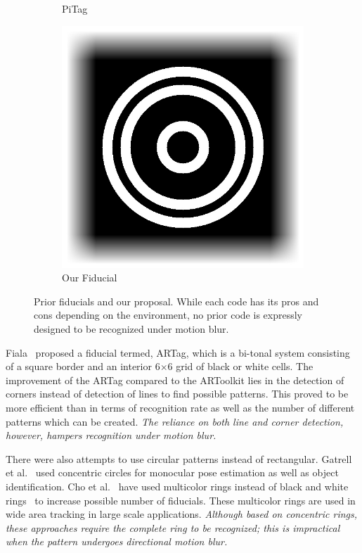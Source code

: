 \begin{figure}[b!]
\begin{subfigure}[b]{0.12\linewidth}
  PiTag\quad~\cite{Pitag13}
 \end{subfigure}\quad
 \begin{subfigure}[b]{0.14\linewidth}
  \centering
  \includegraphics[width=\linewidth]{figures/fiducial/our_fiducial.jpg}
  Our Fiducial
 \end{subfigure}
 \caption[Prior fiducials and our proposal]{Prior fiducials and our proposal. 
 While each code has its pros and cons depending on the environment, no
 prior code is expressly designed to be recognized under motion blur.}
 \label{fig:previous_work}
\end{figure}


Fiala~\cite{Fiala05} proposed a fiducial termed, ARTag, which is a
bi-tonal system consisting of a square border and an interior
6$\times$6 grid of black or white cells. The improvement of the ARTag
compared to the ARToolkit lies in the detection of corners instead of
detection of lines to find possible patterns.  This proved to be more
efficient than \cite{ARToolkit02} in terms of recognition rate as well
as the number of different patterns which can be created.  {\it The
reliance on both line and corner detection, however, hampers
recognition under motion blur.}

There were also attempts to use circular patterns instead of
rectangular.  Gatrell et al.~\cite{concentric} used concentric circles
for monocular pose estimation as well as object identification. Cho et
al.~\cite{Cho:2001,Cho97fastcolor} have used multicolor rings instead
of black and white rings~\cite{concentric} to increase possible number
of fiducials.  These multicolor rings are used in wide area tracking
in large scale applications.  {\it Although based on  concentric rings, these
approaches require the complete ring to be recognized; this is
impractical when the pattern undergoes directional motion blur.}

